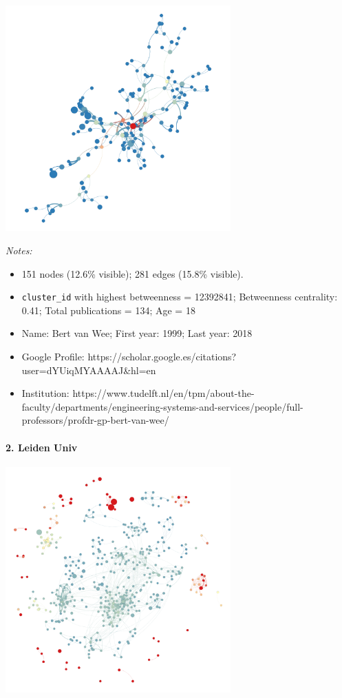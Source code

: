 \documentclass[]{elsarticle} %
\providecommand{\tightlist}{%
  \setlength{\itemsep}{0pt}\setlength{\parskip}{0pt}}
\begin{document}
\includegraphics[width=3.41in]{figs/tu_soc_betweenness}

\emph{Notes:}

\begin{itemize}
\tightlist
\item
  151 nodes (12.6\% visible); 281 edges (15.8\% visible).
\item
  \texttt{cluster\_id} with highest betweenness = 12392841; Betweenness
  centrality: 0.41; Total publications = 134; Age = 18
\item
  Name: Bert van Wee; First year: 1999; Last year: 2018
\item
  Google Profile:
  https://scholar.google.es/citations?user=dYUiqMYAAAAJ\&hl=en
\item
  Institution:
  https://www.tudelft.nl/en/tpm/about-the-faculty/departments/engineering-systems-and-services/people/full-professors/profdr-gp-bert-van-wee/
\end{itemize}

\hypertarget{leiden-univ-2}{%
\paragraph{2. Leiden Univ}\label{leiden-univ-2}}

\includegraphics[width=3.41in]{figs/lu_soc_betweenness}
\end{document}
